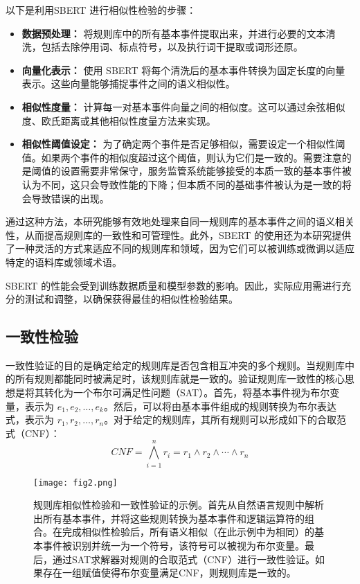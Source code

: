 以下是利用SBERT 进行相似性检验的步骤：
\begin{itemize}
    \item \textbf{数据预处理：} 将规则库中的所有基本事件提取出来，并进行必要的文本清洗，包括去除停用词、标点符号，以及执行词干提取或词形还原。
    \item \textbf{向量化表示：} 使用 SBERT 将每个清洗后的基本事件转换为固定长度的向量表示。这些向量能够捕捉事件之间的语义相似性。
    \item \textbf{相似性度量：} 计算每一对基本事件向量之间的相似度。这可以通过余弦相似度、欧氏距离或其他相似性度量方法来实现。
    \item \textbf{相似性阈值设定：} 为了确定两个事件是否足够相似，需要设定一个相似性阈值。如果两个事件的相似度超过这个阈值，则认为它们是一致的。需要注意的是阈值的设置需要非常保守，服务监管系统能够接受的本质一致的基本事件被认为不同，这只会导致性能的下降；但本质不同的基础事件被认为是一致的将会导致错误的出现。
\end{itemize}

通过这种方法，本研究能够有效地处理来自同一规则库的基本事件之间的语义相关性，从而提高规则库的一致性和可管理性。此外，SBERT 的使用还为本研究提供了一种灵活的方式来适应不同的规则库和领域，因为它们可以被训练或微调以适应特定的语料库或领域术语。

SBERT 的性能会受到训练数据质量和模型参数的影响。因此，实际应用需进行充分的测试和调整，以确保获得最佳的相似性检验结果。

\subsection{一致性检验}

一致性验证的目的是确定给定的规则库是否包含相互冲突的多个规则。当规则库中的所有规则都能同时被满足时，该规则库就是一致的。验证规则库一致性的核心思想是将其转化为一个布尔可满足性问题（SAT）。首先，将基本事件视为布尔变量，表示为 $e_1, e_2, \ldots, e_k$。然后，可以将由基本事件组成的规则转换为布尔表达式，表示为 $r_1, r_2, \ldots, r_n$。对于给定的规则库，其所有规则可以形成如下的合取范式（CNF）：
$$CNF=\bigwedge_{i=1}^{n}r_i=r_1 \land r_2 \land \cdots \land r_n$$

\begin{figure}[!t]
    \centering
    \texttt{[image: fig2.png]}
    \caption{规则库相似性检验和一致性验证的示例。首先从自然语言规则中解析出所有基本事件，并将这些规则转换为基本事件和逻辑运算符的组合。在完成相似性检验后，所有语义相似（在此示例中为相同）的基本事件被识别并统一为一个符号，该符号可以被视为布尔变量。最后，通过SAT求解器对规则的合取范式（CNF）进行一致性验证。如果存在一组赋值使得布尔变量满足CNF，则规则库是一致的。}
    \label{fig_1}
\end{figure}

